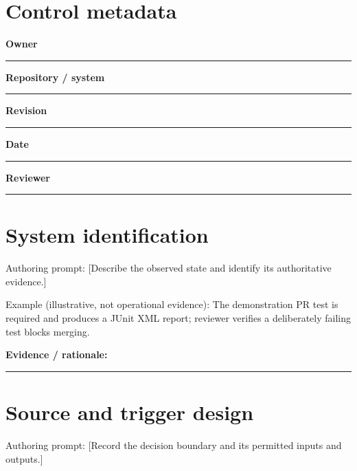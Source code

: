 \documentclass[11pt,letterpaper]{article}
\begin{document}
\makedoctitle\makedocsummary
\section{Control metadata}
\noindent\textbf{Owner}\par\nobreak\vspace{6pt}\noindent\rule{0.93\linewidth}{0.4pt}\par\vspace{14pt}
\noindent\textbf{Repository / system}\par\nobreak\vspace{6pt}\noindent\rule{0.93\linewidth}{0.4pt}\par\vspace{14pt}
\noindent\textbf{Revision}\par\nobreak\vspace{6pt}\noindent\rule{0.93\linewidth}{0.4pt}\par\vspace{14pt}
\noindent\textbf{Date}\par\nobreak\vspace{6pt}\noindent\rule{0.93\linewidth}{0.4pt}\par\vspace{14pt}
\noindent\textbf{Reviewer}\par\nobreak\vspace{6pt}\noindent\rule{0.93\linewidth}{0.4pt}\par\vspace{14pt}
\section{System identification}
Authoring prompt: [Describe the observed state and identify its authoritative evidence.]

Example (illustrative, not operational evidence): The demonstration PR test is required and produces a JUnit XML report; reviewer verifies a deliberately failing test blocks merging.

\noindent\textbf{Evidence / rationale:}\par\nobreak\vspace{8pt}\noindent\rule{0.93\linewidth}{0.4pt}\par\vspace{14pt}
\section{Source and trigger design}
Authoring prompt: [Record the decision boundary and its permitted inputs and outputs.]
\end{document}
